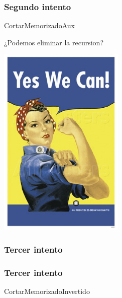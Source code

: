 \documentclass{beamer}
\begin{document}
\begin{frame}
    \frametitle{Segundo intento}
    \begin{algorithm}[H]
        \caption{CortarMemorizadoAux}
        \begin{algorithmic}[1]
        \EndIf
        \Else
        \EndFor
        \EndIf
        \EndProcedure
        \end{algorithmic}
    \end{algorithm}
    ¿Podemos eliminar la recursion?
\end{frame}

\begin{frame}
    \begin{center}
    \includegraphics[width=6cm]{wecan.jpg}
    \end{center}
\end{frame}

\begin{frame}
\frametitle{Tercer intento}
\end{frame}

\begin{frame}
\frametitle{Tercer intento}

\begin{algorithm}[H]
    \caption{CortarMemorizadoInvertido}
    \begin{algorithmic}[1]
        \EndFor
    \EndFor
    \EndProcedure
    \end{algorithmic}
\end{algorithm}

\end{frame}
\end{document}
